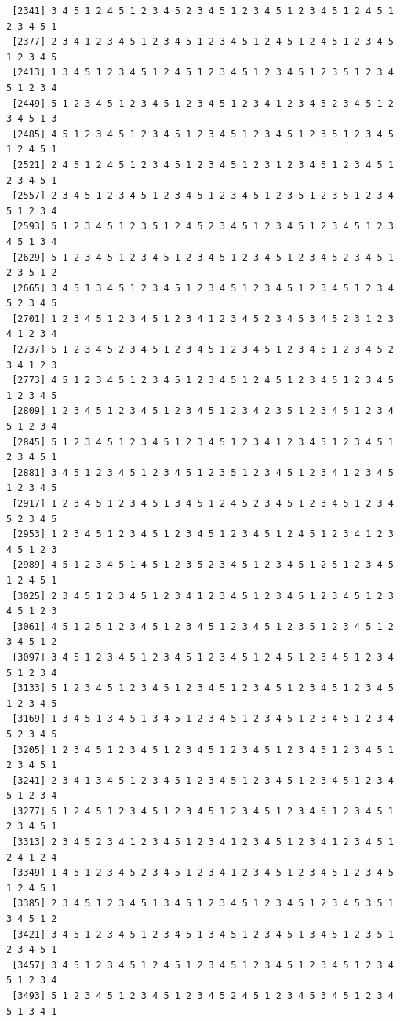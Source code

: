 \documentclass[
  11pt,
]{book}
\begin{document}
\begin{verbatim}
 [2341] 3 4 5 1 2 4 5 1 2 3 4 5 2 3 4 5 1 2 3 4 5 1 2 3 4 5 1 2 4 5 1 2 3 4 5 1
 [2377] 2 3 4 1 2 3 4 5 1 2 3 4 5 1 2 3 4 5 1 2 4 5 1 2 4 5 1 2 3 4 5 1 2 3 4 5
 [2413] 1 3 4 5 1 2 3 4 5 1 2 4 5 1 2 3 4 5 1 2 3 4 5 1 2 3 5 1 2 3 4 5 1 2 3 4
 [2449] 5 1 2 3 4 5 1 2 3 4 5 1 2 3 4 5 1 2 3 4 1 2 3 4 5 2 3 4 5 1 2 3 4 5 1 3
 [2485] 4 5 1 2 3 4 5 1 2 3 4 5 1 2 3 4 5 1 2 3 4 5 1 2 3 5 1 2 3 4 5 1 2 4 5 1
 [2521] 2 4 5 1 2 4 5 1 2 3 4 5 1 2 3 4 5 1 2 3 1 2 3 4 5 1 2 3 4 5 1 2 3 4 5 1
 [2557] 2 3 4 5 1 2 3 4 5 1 2 3 4 5 1 2 3 4 5 1 2 3 5 1 2 3 5 1 2 3 4 5 1 2 3 4
 [2593] 5 1 2 3 4 5 1 2 3 5 1 2 4 5 2 3 4 5 1 2 3 4 5 1 2 3 4 5 1 2 3 4 5 1 3 4
 [2629] 5 1 2 3 4 5 1 2 3 4 5 1 2 3 4 5 1 2 3 4 5 1 2 3 4 5 2 3 4 5 1 2 3 5 1 2
 [2665] 3 4 5 1 3 4 5 1 2 3 4 5 1 2 3 4 5 1 2 3 4 5 1 2 3 4 5 1 2 3 4 5 2 3 4 5
 [2701] 1 2 3 4 5 1 2 3 4 5 1 2 3 4 1 2 3 4 5 2 3 4 5 3 4 5 2 3 1 2 3 4 1 2 3 4
 [2737] 5 1 2 3 4 5 2 3 4 5 1 2 3 4 5 1 2 3 4 5 1 2 3 4 5 1 2 3 4 5 2 3 4 1 2 3
 [2773] 4 5 1 2 3 4 5 1 2 3 4 5 1 2 3 4 5 1 2 4 5 1 2 3 4 5 1 2 3 4 5 1 2 3 4 5
 [2809] 1 2 3 4 5 1 2 3 4 5 1 2 3 4 5 1 2 3 4 2 3 5 1 2 3 4 5 1 2 3 4 5 1 2 3 4
 [2845] 5 1 2 3 4 5 1 2 3 4 5 1 2 3 4 5 1 2 3 4 1 2 3 4 5 1 2 3 4 5 1 2 3 4 5 1
 [2881] 3 4 5 1 2 3 4 5 1 2 3 4 5 1 2 3 5 1 2 3 4 5 1 2 3 4 1 2 3 4 5 1 2 3 4 5
 [2917] 1 2 3 4 5 1 2 3 4 5 1 3 4 5 1 2 4 5 2 3 4 5 1 2 3 4 5 1 2 3 4 5 2 3 4 5
 [2953] 1 2 3 4 5 1 2 3 4 5 1 2 3 4 5 1 2 3 4 5 1 2 4 5 1 2 3 4 1 2 3 4 5 1 2 3
 [2989] 4 5 1 2 3 4 5 1 4 5 1 2 3 5 2 3 4 5 1 2 3 4 5 1 2 5 1 2 3 4 5 1 2 4 5 1
 [3025] 2 3 4 5 1 2 3 4 5 1 2 3 4 1 2 3 4 5 1 2 3 4 5 1 2 3 4 5 1 2 3 4 5 1 2 3
 [3061] 4 5 1 2 5 1 2 3 4 5 1 2 3 4 5 1 2 3 4 5 1 2 3 5 1 2 3 4 5 1 2 3 4 5 1 2
 [3097] 3 4 5 1 2 3 4 5 1 2 3 4 5 1 2 3 4 5 1 2 4 5 1 2 3 4 5 1 2 3 4 5 1 2 3 4
 [3133] 5 1 2 3 4 5 1 2 3 4 5 1 2 3 4 5 1 2 3 4 5 1 2 3 4 5 1 2 3 4 5 1 2 3 4 5
 [3169] 1 3 4 5 1 3 4 5 1 3 4 5 1 2 3 4 5 1 2 3 4 5 1 2 3 4 5 1 2 3 4 5 2 3 4 5
 [3205] 1 2 3 4 5 1 2 3 4 5 1 2 3 4 5 1 2 3 4 5 1 2 3 4 5 1 2 3 4 5 1 2 3 4 5 1
 [3241] 2 3 4 1 3 4 5 1 2 3 4 5 1 2 3 4 5 1 2 3 4 5 1 2 3 4 5 1 2 3 4 5 1 2 3 4
 [3277] 5 1 2 4 5 1 2 3 4 5 1 2 3 4 5 1 2 3 4 5 1 2 3 4 5 1 2 3 4 5 1 2 3 4 5 1
 [3313] 2 3 4 5 2 3 4 1 2 3 4 5 1 2 3 4 1 2 3 4 5 1 2 3 4 1 2 3 4 5 1 2 4 1 2 4
 [3349] 1 4 5 1 2 3 4 5 2 3 4 5 1 2 3 4 1 2 3 4 5 1 2 3 4 5 1 2 3 4 5 1 2 4 5 1
 [3385] 2 3 4 5 1 2 3 4 5 1 3 4 5 1 2 3 4 5 1 2 3 4 5 1 2 3 4 5 3 5 1 3 4 5 1 2
 [3421] 3 4 5 1 2 3 4 5 1 2 3 4 5 1 3 4 5 1 2 3 4 5 1 3 4 5 1 2 3 5 1 2 3 4 5 1
 [3457] 3 4 5 1 2 3 4 5 1 2 4 5 1 2 3 4 5 1 2 3 4 5 1 2 3 4 5 1 2 3 4 5 1 2 3 4
 [3493] 5 1 2 3 4 5 1 2 3 4 5 1 2 3 4 5 2 4 5 1 2 3 4 5 3 4 5 1 2 3 4 5 1 3 4 1

\end{verbatim}
\end{document}
